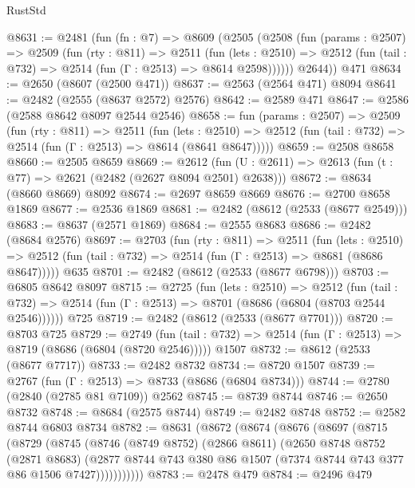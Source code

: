 \begin{lexlean}{RustStd}
\begin{coremodule}
@8631 := @2481
    (fun (fn : @7) =>
    @8609
      (@2505
        (@2508
          (fun (params : @2507) =>
          @2509
            (fun (rty : @811) =>
            @2511
              (fun (lets : @2510) =>
              @2512 (fun (tail : @732) => @2514 (fun (Γ : @2513) => @8614 @2598))))))
        @2644))
    @471
@8634 := @2650 (@8607 (@2500 @471))
@8637 := @2563 (@2564 @471) @8094
@8641 := @2482 (@2555 (@8637 @2572) @2576)
@8642 := @2589 @471
@8647 := @2586 (@2588 @8642 @8097 @2544 @2546)
@8658 := fun (params : @2507) =>
  @2509
    (fun (rty : @811) =>
    @2511
      (fun (lets : @2510) =>
      @2512 (fun (tail : @732) => @2514 (fun (Γ : @2513) => @8614 (@8641 @8647)))))
@8659 := @2508 @8658
@8660 := @2505 @8659
@8669 := @2612 (fun (U : @2611) => @2613 (fun (t : @77) => @2621 (@2482 (@2627 @8094 @2501) @2638)))
@8672 := @8634 (@8660 @8669) @8092
@8674 := @2697 @8659 @8669
@8676 := @2700 @8658 @1869
@8677 := @2536 @1869
@8681 := @2482 (@8612 (@2533 (@8677 @2549)))
@8683 := @8637 (@2571 @1869)
@8684 := @2555 @8683
@8686 := @2482 (@8684 @2576)
@8697 := @2703
    (fun (rty : @811) =>
    @2511
      (fun (lets : @2510) =>
      @2512 (fun (tail : @732) => @2514 (fun (Γ : @2513) => @8681 (@8686 @8647)))))
    @635
@8701 := @2482 (@8612 (@2533 (@8677 @6798)))
@8703 := @6805 @8642 @8097
@8715 := @2725
    (fun (lets : @2510) =>
    @2512
      (fun (tail : @732) => @2514 (fun (Γ : @2513) => @8701 (@8686 (@6804 (@8703 @2544 @2546))))))
    @725
@8719 := @2482 (@8612 (@2533 (@8677 @7701)))
@8720 := @8703 @725
@8729 := @2749
    (fun (tail : @732) => @2514 (fun (Γ : @2513) => @8719 (@8686 (@6804 (@8720 @2546)))))
    @1507
@8732 := @8612 (@2533 (@8677 @7717))
@8733 := @2482 @8732
@8734 := @8720 @1507
@8739 := @2767 (fun (Γ : @2513) => @8733 (@8686 (@6804 @8734)))
@8744 := @2780 (@2840 (@2785 @81 @7109)) @2562
@8745 := @8739 @8744
@8746 := @2650 @8732
@8748 := @8684 (@2575 @8744)
@8749 := @2482 @8748
@8752 := @2582 @8744 @6803 @8734
@8782 := @8631
    (@8672
      (@8674
        (@8676
          (@8697
            (@8715
              (@8729
                (@8745
                  (@8746
                    (@8749 @8752)
                    (@2866 @8611)
                    (@2650
                      @8748
                      @8752
                      (@2871 @8683)
                      (@2877
                        @8744
                        @743
                        @380
                        @86
                        @1507
                        (@7374 @8744 @743 @377 @86 @1506 @7427)))))))))))
@8783 := @2478 @479
@8784 := @2496 @479

\end{coremodule}
\end{lexlean}
